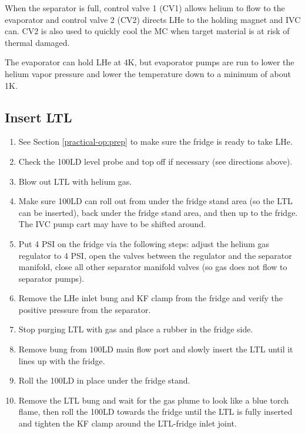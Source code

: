 When the separator is full, control valve 1 (CV1) allows helium to flow to the evaporator and control valve 2 (CV2) directs LHe to the holding magnet and IVC can.  CV2 is also used to quickly cool the MC when target material is at risk of thermal damaged.

The evaporator can hold LHe at 4K, but evaporator pumps are run to lower the helium vapor pressure and lower the temperature down to a minimum of about 1K.

\subsection{Insert LTL}
\begin{enumerate}
 \item See Section \ref{practical-op:prep} to make sure the fridge is ready to take LHe.
 \item Check the 100LD level probe and top off if necessary (see directions above).
 \item Blow out LTL with helium gas.
 \item Make sure 100LD can roll out from under the fridge stand area (so the LTL can be inserted), back under the fridge stand area, and then up to the fridge.  The IVC pump cart may have to be shifted around.
 \item Put 4 PSI on the fridge via the following steps: adjust the helium gas regulator to 4 PSI, open the valves between the regulator and the separator manifold, close all other separator manifold valves (so gas does not flow to separator pumps).
 \item Remove the LHe inlet bung and KF clamp from the fridge and verify the positive pressure from the separator.
 \item Stop purging LTL with gas and place a rubber in the fridge side.
 \item Remove bung from 100LD main flow port and slowly insert the LTL until it lines up with the fridge.
 \item Roll the 100LD in place under the fridge stand.
 \item Remove the LTL bung and wait for the gas plume to look like a blue torch flame, then roll the 100LD towards the fridge until the LTL is fully inserted and tighten the KF clamp around the LTL-fridge inlet joint.
 \end{enumerate}
 
